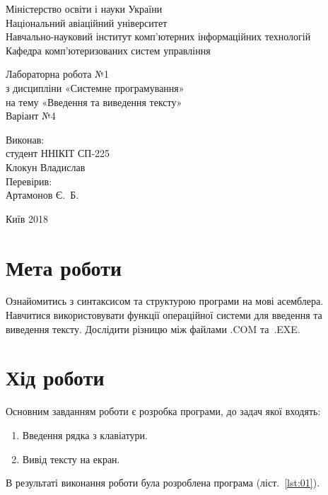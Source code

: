 \documentclass[a4paper,oneside,DIV=12,12pt]{scrartcl}
\begin{document}
	\begin{titlepage}
	\centering
		Міністерство освіти і науки України\\
		Національний авіаційний університет\\
		Навчально-науковий інститут комп'ютерних інформаційних технологій\\
		Кафедра комп'ютеризованих систем управління

		\vspace{\fill}

		Лабораторна робота №1\\
		з дисципліни «Системне програмування»\\
		на тему «Введення та виведення тексту»\\
		Варіант №4

		\vspace{\fill}
		
		\begin{flushright}
			Виконав:\\
			студент ННІКІТ СП-225\\
			Клокун Владислав\\
			Перевірив:\\
			Артамонов Є.~Б.
		\end{flushright}

		Київ 2018
    \end{titlepage}
	
	\section{Мета роботи}
		Ознайомитись з синтаксисом та структурою програми на мові асемблера. Навчитися використовувати функції операційної системи для введення та виведення тексту. Дослідити різницю між файлами .COM та~.EXE.
		
	\section{Хід роботи}
		Основним завданням роботи є розробка програми, до задач якої входять:
		\begin{enumerate}
			\item Введення рядка з клавіатури.
			\item Вивід тексту на екран.
		\end{enumerate}
		В результаті виконання роботи була розроблена програма (ліст.~\ref{lst:01}).
				
				
\end{document}
